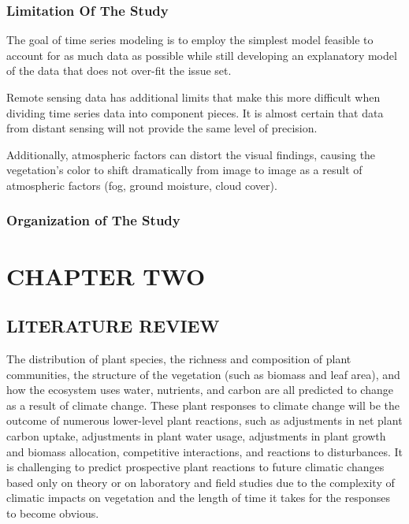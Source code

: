 \documentclass[
  onepage,
  openany]{scrbook}
\begin{document}
\hypertarget{limitation-of-the-study}{%
\subsection{Limitation Of The Study}\label{limitation-of-the-study}}

The goal of time series modeling is to employ the simplest model
feasible to account for as much data as possible while still developing
an explanatory model of the data that does not over-fit the issue set.

Remote sensing data has additional limits that make this more difficult
when dividing time series data into component pieces. It is almost
certain that data from distant sensing will not provide the same level
of precision.

Additionally, atmospheric factors can distort the visual findings,
causing the vegetation's color to shift dramatically from image to image
as a result of atmospheric factors (fog, ground moisture, cloud cover).

\hypertarget{organization-of-the-study}{%
\subsection{Organization of The Study}\label{organization-of-the-study}}

\hypertarget{chapter-two}{%
\chapter{CHAPTER TWO}\label{chapter-two}}

\hypertarget{literature-review}{%
\section{LITERATURE REVIEW}\label{literature-review}}

The distribution of plant species, the richness and composition of plant
communities, the structure of the vegetation (such as biomass and leaf
area), and how the ecosystem uses water, nutrients, and carbon are all
predicted to change as a result of climate change. These plant responses
to climate change will be the outcome of numerous lower-level plant
reactions, such as adjustments in net plant carbon uptake, adjustments
in plant water usage, adjustments in plant growth and biomass
allocation, competitive interactions, and reactions to disturbances. It
is challenging to predict prospective plant reactions to future climatic
changes based only on theory or on laboratory and field studies due to
the complexity of climatic impacts on vegetation and the length of time
it takes for the responses to become obvious.
\end{document}
